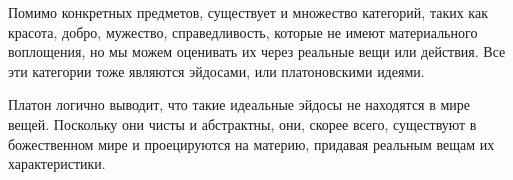 Помимо конкретных предметов, существует и множество категорий, таких как красота, добро, мужество, справедливость, которые не имеют материального воплощения, но мы можем оценивать их через реальные вещи или действия. Все эти категории тоже являются эйдосами, или платоновскими идеями.

Платон логично выводит, что такие идеальные эйдосы не находятся в мире вещей. Поскольку они чисты и абстрактны, они, скорее всего, существуют в божественном мире и проецируются на материю, придавая реальным вещам их характеристики.


